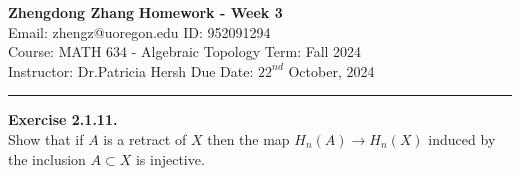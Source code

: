 \documentclass[a4paper, 11pt]{article}
\newenvironment{problem}[2][Exercise]
    { \begin{mdframed}[backgroundcolor=gray!20] \textbf{#1 #2} \\}
    {  \end{mdframed}}
\begin{document}
\noindent
\large\textbf{Zhengdong Zhang} \hfill \textbf{Homework - Week 3}   \\
Email: zhengz@uoregon.edu \hfill ID: 952091294 \\
\normalsize Course: MATH 634 - Algebraic Topology  \hfill Term: Fall 2024\\
Instructor: Dr.Patricia Hersh \hfill Due Date: $22^{nd}$ October, 2024 \\
\noindent\rule{7in}{2.8pt}
\begin{problem}{2.1.11.}
Show that if \(A\) is a retract of \(X\) then the map \(H_n(A)\rightarrow H_n(X)\) induced by the inclusion \(A\subset X\) is injective.
\end{problem}
\end{document}

